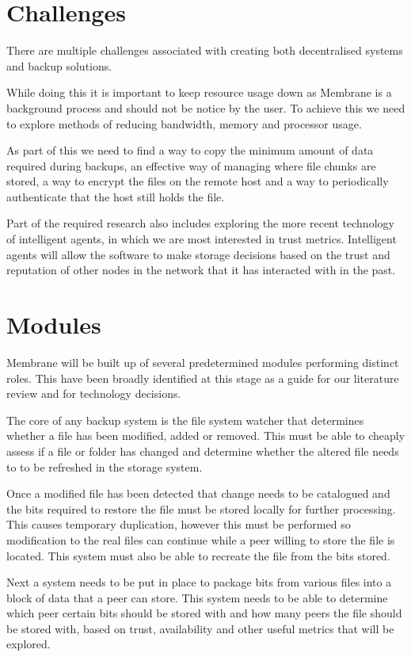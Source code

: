 \documentclass[a4paper, 11pt, twocolumn, twoside]{report}
\begin{document}
\section{Challenges}
There are multiple challenges associated with creating both decentralised systems and backup solutions.

While doing this it is important to keep resource usage down as Membrane is a background process and should not be notice by the user. To achieve this we need to explore methods of reducing bandwidth, memory and processor usage.

As part of this we need to find a way to copy the minimum amount of data required during backups, an effective way of managing where file chunks are stored, a way to encrypt the files on the remote host and a way to periodically authenticate that the host still holds the file.

Part of the required research also includes exploring the more recent technology of intelligent agents, in which we are most interested in trust metrics. Intelligent agents will allow the software to make storage decisions based on the trust and reputation of other nodes in the network that it has interacted with in the past.

\section{Modules}

Membrane will be built up of several predetermined modules performing distinct roles. This have been broadly identified at this stage as a guide for our literature review and for technology decisions.

The core of any backup system is the file system watcher that determines whether a file has been modified, added or removed. This must be able to cheaply assess if a file or folder has changed and determine whether the altered file needs to to be refreshed in the storage system.

Once a modified file has been detected that change needs to be catalogued and the bits required to restore the file must be stored locally for further processing. This causes temporary duplication, however this must be performed so modification to the real files can continue while a peer willing to store the file is located. This system must also be able to recreate the file from the bits stored.

Next a system needs to be put in place to package bits from various files into a block of data that a peer can store. This system needs to be able to determine which peer certain bits should be stored with and how many peers the file should be stored with, based on trust, availability and other useful metrics that will be explored.
\end{document}
